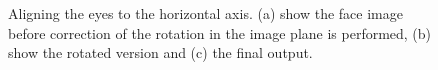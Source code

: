 \begin{figure}[H]
\caption{Aligning the eyes to the horizontal axis. (a) show the face image before correction of the rotation in the image plane is performed, (b) show the rotated version and (c) the final output.}
\label{fig:rotationAndOutput}
\end{figure}



